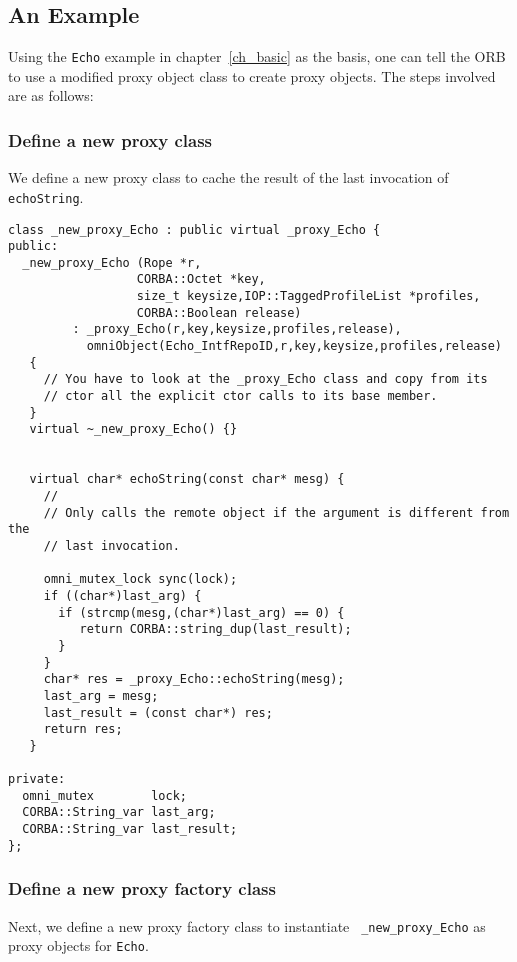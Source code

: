 \documentclass[11pt,twoside,onecolumn]{book}
\begin{document}
\subsection{An Example}

Using the {\tt Echo} example in chapter~\ref{ch_basic} as the basis, one
can tell the ORB to use a modified proxy object class to create proxy
objects. The steps involved are as follows:

\subsubsection{Define a new proxy class}

We define a new proxy class to cache the result of the last
invocation of {\tt echoString}.

{\small
\begin{verbatim}
class _new_proxy_Echo : public virtual _proxy_Echo {
public:
  _new_proxy_Echo (Rope *r,
                  CORBA::Octet *key,
                  size_t keysize,IOP::TaggedProfileList *profiles,
                  CORBA::Boolean release) 
         : _proxy_Echo(r,key,keysize,profiles,release),
           omniObject(Echo_IntfRepoID,r,key,keysize,profiles,release) 
   {
     // You have to look at the _proxy_Echo class and copy from its
     // ctor all the explicit ctor calls to its base member.
   }
   virtual ~_new_proxy_Echo() {}


   virtual char* echoString(const char* mesg) {
     //
     // Only calls the remote object if the argument is different from the
     // last invocation.

     omni_mutex_lock sync(lock);
     if ((char*)last_arg) {
       if (strcmp(mesg,(char*)last_arg) == 0) {
          return CORBA::string_dup(last_result);
       }
     }
     char* res = _proxy_Echo::echoString(mesg);
     last_arg = mesg;
     last_result = (const char*) res;
     return res;
   }

private:
  omni_mutex        lock;
  CORBA::String_var last_arg;
  CORBA::String_var last_result;
};
\end{verbatim}
}

\subsubsection{Define a new proxy factory class}

Next, we define a new proxy factory class to instantiate {\tt
\_new\_proxy\_Echo} as proxy objects for {\tt Echo}.
\end{document}
